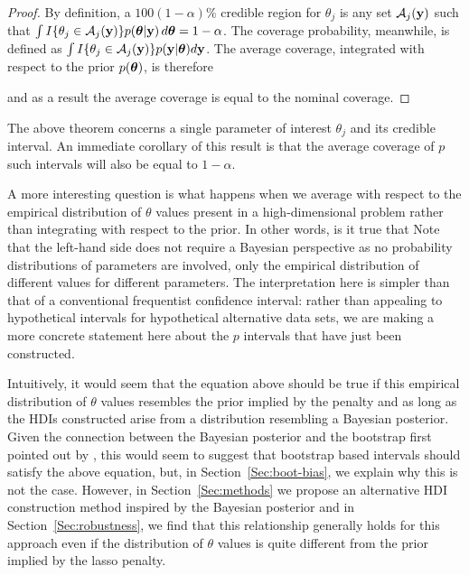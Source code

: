\begin{proof}
By definition, a $100(1-\alpha)\%$ credible region for $\theta_j$ is any set $\mathcal{A}_j(\mathbf{y})$ such that $\int I\{\theta_j \in \mathcal{A}_j(\mathbf{y})\} p(\boldsymbol{\theta}|\mathbf{y})\,d\boldsymbol{\theta} = 1 - \alpha$. The coverage probability, meanwhile, is defined as $\int I\{\theta_j \in \mathcal{A}_j(\mathbf{y})\} p(\mathbf{y} | \boldsymbol{\theta})d\mathbf{y}$. The average coverage, integrated with respect to the prior $p(\boldsymbol{\theta})$, is therefore


\noindent and as a result the average coverage is equal to the nominal coverage.
\end{proof}

The above theorem concerns a single parameter of interest $\theta_j$ and its credible interval. An immediate corollary of this result is that the average coverage of $p$ such intervals will also be equal to $1-\alpha$.

A more interesting question is what happens when we average with respect to the empirical distribution of $\theta$ values present in a high-dimensional problem rather than integrating with respect to the prior. In other words, is it true that
Note that the left-hand side does not require a Bayesian perspective as no probability distributions of parameters are involved, only the empirical distribution of different values for different parameters. The interpretation here is simpler than that of a conventional frequentist confidence interval: rather than appealing to hypothetical intervals for hypothetical alternative data sets, we are making a more concrete statement here about the $p$ intervals that have just been constructed.

Intuitively, it would seem that the equation above should be true if this empirical distribution of $\theta$ values resembles the prior implied by the penalty and as long as the HDIs constructed arise from a distribution resembling a Bayesian posterior. Given the connection between the Bayesian posterior and the bootstrap first pointed out by \cite{Rubin1981}, this would seem to suggest that bootstrap based intervals should satisfy the above equation, but, in Section~\ref{Sec:boot-bias}, we explain why this is not the case. However, in Section~\ref{Sec:methods} we propose an alternative HDI construction method inspired by the Bayesian posterior and in Section~\ref{Sec:robustness}, we find that this relationship generally holds for this approach even if the distribution of $\theta$ values is quite different from the prior implied by the lasso penalty.

